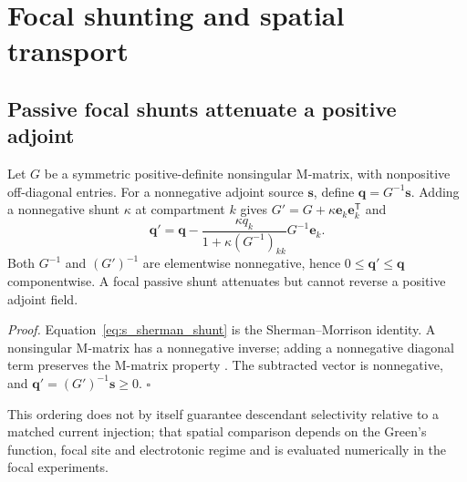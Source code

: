 \section{Focal shunting and spatial transport}
\label{note:shunt_transport}

\subsection{Passive focal shunts attenuate a positive adjoint}

\begin{proposition}
Let $G$ be a symmetric positive-definite nonsingular M-matrix, with
nonpositive off-diagonal entries. For a nonnegative adjoint source
$\bm s$, define $\bm q=G^{-1}\bm s$. Adding a
nonnegative shunt $\kappa$ at compartment $k$ gives
$G'=G+\kappa\bm e_k\bm e_k^{\mathsf T}$ and
\begin{equation}
\bm q'=\bm q-
\frac{\kappa q_k}{1+\kappa(G^{-1})_{kk}}G^{-1}\bm e_k.
\label{eq:s_sherman_shunt}
\end{equation}
Both $G^{-1}$ and $(G')^{-1}$ are elementwise nonnegative, hence
$0\leq\bm q'\leq\bm q$ componentwise. A focal passive shunt attenuates but
cannot reverse a positive adjoint field.
\end{proposition}

\noindent\emph{Proof.}
Equation~\ref{eq:s_sherman_shunt} is the Sherman--Morrison identity. A
nonsingular M-matrix has a nonnegative inverse; adding a nonnegative diagonal
term preserves the M-matrix property \citep{horn2013matrix}. The subtracted vector is nonnegative,
and $\bm q'=(G')^{-1}\bm s\geq0$. \hfill$\square$

This ordering does not by itself guarantee descendant selectivity relative to
a matched current injection; that spatial comparison depends on the Green's
function, focal site and electrotonic regime and is evaluated numerically in
the focal experiments.

